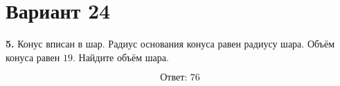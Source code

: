 \documentclass[12pt,a4paper]{article}
\begin{document}
\section*{Вариант 24}

\textbf{5.} Конус вписан в шар. Радиус основания конуса равен радиусу шара.
Объём конуса равен \(19\). Найдите объём шара.

\begin{center}
\end{center}

\[
\boxed{\text{Ответ: }76}
\]
\end{document}
